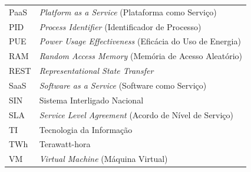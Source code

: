 \begin{tabular}{p{2.2cm} p{11.3cm}}
	PaaS   & \textit{Platform as a Service} (Plataforma como Serviço) \\[3.5pt]
	PID    & \textit{Process Identifier} (Identificador de Processo) \\[3.5pt]
	PUE    & \textit{Power Usage Effectiveness} (Eficácia do Uso de Energia) \\[3.5pt]
	RAM    & \textit{Random Access Memory} (Memória de Acesso Aleatório) \\[3.5pt]
	REST   & \textit{Representational State Transfer} \\[3.5pt]
	SaaS   & \textit{Software as a Service} (Software como Serviço) \\[3.5pt]
	SIN    & Sistema Interligado Nacional \\[3.5pt]
	SLA    & \textit{Service Level Agreement} (Acordo de Nível de Serviço) \\[3.5pt]
	TI     & Tecnologia da Informação \\[3.5pt]
	TWh    & Terawatt-hora \\[3.5pt]
	VM     & \textit{Virtual Machine} (Máquina Virtual) \\
\end{tabular}
\normalsize

\newpage

\tableofcontents
\newpage
